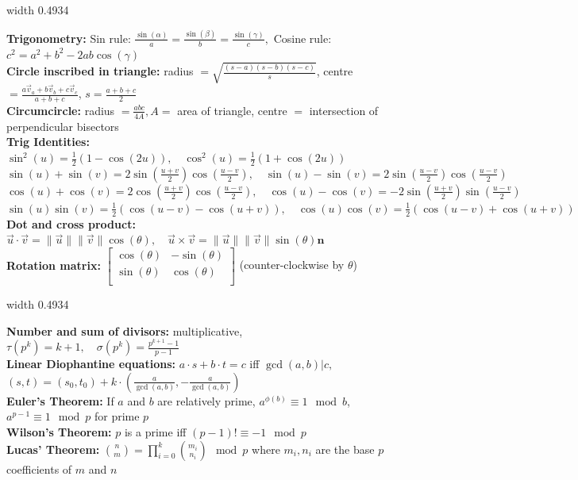 \documentclass[a4paper,twocolumn]{article}
\newcommand\disappearingrule{%
	\par %
	\vskip5pt %
	\leaders\vrule width 0.4934\textwidth\vskip0.4pt %
	\nointerlineskip %
	\vskip2pt %
}
\begin{document}
{\disappearingrule

\textbf{Trigonometry: } \textnormal{Sin rule: } $\frac{\sin(\alpha)}{a} = \frac{\sin(\beta)}{b} = \frac{\sin(\gamma)}{c},$ \quad \textnormal{Cosine rule: } $c^2 = a^2 + b^2 - 2ab\cos(\gamma)$ \\
\textbf{Circle inscribed in triangle: } \textnormal{radius $= \sqrt{\frac{(s-a)(s-b)(s-c)}{s}}$, \quad centre $= \frac{a\vec{v}_a + b\vec{v}_b + c\vec{v}_c}{a+b+c}$, \quad $s = \frac{a+b+c}{2}$} \\
\textbf{Circumcircle: } \textnormal{radius $ = \frac{abc}{4A}, A = $ area of triangle, centre $ = $ intersection of perpendicular bisectors }  \\
\textbf{Trig Identities: } $\sin^2(u) = \frac{1}{2}(1-\cos(2u)), \quad \cos^2(u) = \frac{1}{2}(1 + \cos(2u)) $ \\
$\sin(u) + \sin(v) = 2\sin(\frac{u+v}{2})\cos(\frac{u-v}{2}), \quad \sin(u) - \sin(v) = 2\sin(\frac{u-v}{2})\cos(\frac{u-v}{2})$ \\
$\cos(u) + \cos(v) = 2\cos(\frac{u+v}{2})\cos(\frac{u-v}{2}), \quad \cos(u) - \cos(v) = -2\sin(\frac{u+v}{2})\sin(\frac{u-v}{2}) $ \\
$\sin(u)\sin(v) = \frac{1}{2}(\cos(u-v)-\cos(u+v)), \quad \cos(u)\cos(v) = \frac{1}{2}(\cos(u-v)+\cos(u+v))$ \\
\textbf{Dot and cross product: } $\vec{u} \cdot \vec{v} = \|\vec{u}\| \|\vec{v} \| \cos(\theta), \quad \vec{u} \times \vec{v} = \|\vec{u}\| \|\vec{v} \| \sin(\theta) \mathbf{n}$ \\
\textbf{Rotation matrix: } $\begin{bmatrix}
\cos(\theta)       & -\sin(\theta) \\
\sin(\theta)       & \cos(\theta) \\
\end{bmatrix}$ \textnormal{(counter-clockwise by $\theta$)}

\disappearingrule

\textbf{Number and sum of divisors: } \textnormal{multiplicative, $\tau(p^k) = k+1,\quad \sigma(p^k) = \frac{p^{k+1}-1}{p-1}$} \\
\textbf{Linear Diophantine equations: } $a\cdot s + b\cdot t = c$ \textnormal{iff} $\gcd(a,b) | c,$ \quad $(s,t) = (s_0, t_0) + k \cdot \left(\frac{a}{\gcd(a,b)} , -\frac{a}{\gcd(a,b)} \right)$ \\
\textbf{Euler's Theorem: } \textnormal{If $a$ and $b$ are relatively prime, $a^{\phi(b)} \equiv 1 \mod b$, \quad $a^{p-1} \equiv 1 \mod p$ for prime $p$}  \\
\textbf{Wilson's Theorem: } \textnormal{$p$ is a prime iff $(p-1)! \equiv -1 \mod p$} \\
\textbf{Lucas' Theorem: } \textnormal{$\binom{n}{m} = \prod\limits_{i=0}^k \binom{m_i}{n_i} \mod p$ where $m_i, n_i$ are the base $p$ coefficients of $m$ and $n$}  \\

}
\end{document}
